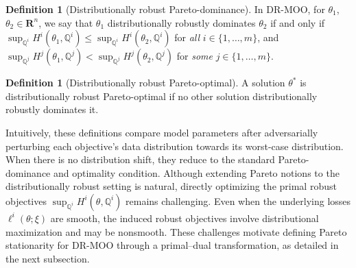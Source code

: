 \documentclass[twoside]{article} %
\theoremstyle{plain}
\theoremstyle{definition}
\newtheorem{definition}[theorem]{Definition}
\theoremstyle{remark}
\begin{document}
\begin{definition}[Distributionally robust Pareto-dominance]\label{Def: Pareto-dominance in DR-MOO}
In DR-MOO, for $\theta_1$, $\theta_2\in \mathbf{R}^n$, we say that ${\theta}_1$ distributionally robustly dominates ${\theta}_2$ if and only if $\sup_{\mathbb{Q}^i}H^i({\theta}_1,\mathbb{Q}^i)\leq \sup_{\mathbb{Q}^i}H^i({\theta}_2,\mathbb{Q}^i)$ for \textit{all} $i\in \{1,\dots,m\}$, and $\sup_{\mathbb{Q}^j}H^j({\theta}_1,\mathbb{Q}^j) < \sup_{\mathbb{Q}^j}H^j({\theta}_2,\mathbb{Q}^j)$ for \textit{some} $j\in \{1,\dots,m\}$.
     
\end{definition}
\begin{definition}[Distributionally robust Pareto-optimal]\label{Def: Pareto-optimal under distribution uncertain}
A solution ${\theta}^*$ is distributionally robust Pareto-optimal if no other solution distributionally robustly dominates it.
\end{definition}
Intuitively, these definitions compare model parameters after adversarially perturbing each objective’s data distribution towards its worst-case distribution. When there is no distribution shift, they reduce to the standard Pareto-dominance and optimality condition.  Although extending Pareto notions to the distributionally robust setting is natural, directly optimizing the primal robust objectives
\(\sup_{\mathbb{Q}^i} H^i(\theta,\mathbb{Q}^i)\) remains challenging.
Even when the underlying losses \(\ell^i(\theta;\xi)\) are smooth, the induced robust objectives involve distributional maximization and may be nonsmooth.
These challenges motivate defining Pareto stationarity for DR-MOO through a primal--dual transformation, as detailed in the next subsection.
\end{document}
